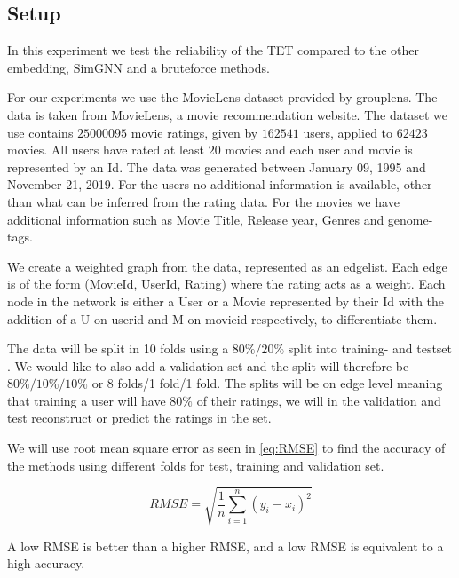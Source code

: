 \subsection{Setup}
In this experiment we test the reliability of the TET compared to the other embedding, SimGNN and a bruteforce methods. 

For our experiments we use the MovieLens dataset provided by grouplens\cite{Grouplensdata}. The data is taken from MovieLens, a movie recommendation website. The dataset we use contains $25000095$ movie ratings, given by $162541$ users, applied to $62423$ movies. All users have rated at least $20$ movies and each user and movie is represented by an Id. The data was generated between January 09, 1995 and November 21, 2019. For the users no additional information is available, other than what can be inferred from the rating data. For the movies we have additional information such as Movie Title, Release year, Genres and genome-tags.

We create a weighted graph from the data, represented as an edgelist. Each edge is of the form (MovieId, UserId, Rating) where the rating acts as a weight. Each node in the network is either a User or a Movie represented by their Id with the addition of a U on userid and M on movieid respectively, to differentiate them.

The data will be split in 10 folds using a $80\%/20\%$ split into training- and testset \cite{Ricci2015}. We would like to also add a validation set and the split will therefore be $80\%/10\%/10\%$ or 8 folds/1 fold/1 fold. The splits will be on edge level meaning that training a user will have $80\%$ of their ratings, we will in the validation and test reconstruct or predict the ratings in the set.

We will use root mean square error as seen in \autoref{eq:RMSE}\cite{chai2014root} to find the accuracy of the methods using different folds for test, training  and validation set.

\begin{equation}\label{eq:RMSE}
RMSE = \sqrt{\frac{1}{n}\sum^n_{i=1}(y_i - x_i)^2}
\end{equation}

A low RMSE is better than a higher RMSE, and a low RMSE is equivalent to a high accuracy.

